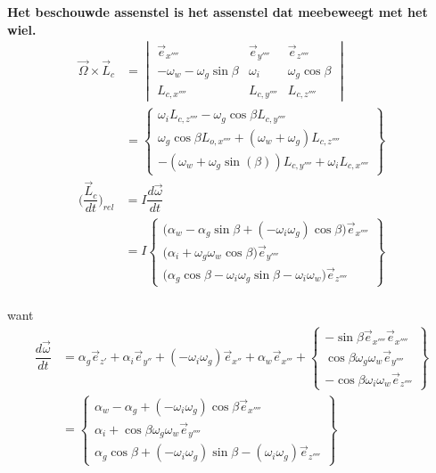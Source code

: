 \documentclass[a4paper,10pt]{article}
\begin{document}
\textbf{Het beschouwde assenstel is het assenstel dat meebeweegt met het wiel.}
\begin{equation}
\begin{aligned}
\vec{\Omega} \times \vec{L}_c &= \begin{vmatrix}
\vec{e}_{x''''} & \vec{e}_{y''''} & \vec{e}_{z''''}\\
-\omega_w -\omega_g  \sin{\beta} & \omega_i & \omega_g\cos{\beta} \\
L_{c,x''''} & L_{c,y''''}  & L_{c,z''''} 
\end{vmatrix}\\
&=\begin{Bmatrix}
\omega_i L_{c,z''''}-\omega_g \cos{\beta} L_{c,y''''}\\
\omega_g \cos{\beta} L_{o,x''''} + (\omega_w + \omega_g ) L_{c,z''''}\\
-(\omega_w + \omega_g \sin(\beta ))L_{c,y''''} + \omega_i L_{c,x''''}
\end{Bmatrix}
\end{aligned}
\end{equation}
\begin{equation}
\begin{aligned}
\Big( \dfrac{\vec{L}_c}{dt}\Big)_{rel} &= I \dfrac{d\vec{\omega}}{dt}\\
&= I \begin{Bmatrix}
\Big(\alpha_w - \alpha_g \sin{\beta} + (-\omega_i \omega_g)\cos{\beta}\Big)\vec{e}_{x''''}\\
\Big(\alpha_i + \omega_g\omega_w\cos{\beta}\Big)\vec{e}_{y''''}\\
\Big(\alpha_g \cos{\beta} - \omega_i\omega_g\sin{\beta}-\omega_i\omega_w\Big) \vec{e}_{z''''}
\end{Bmatrix}
\end{aligned}
\end{equation}\\
want \\
\begin{equation}
\begin{aligned}
\dfrac{d\vec{\omega}}{dt}&=\alpha_g \vec{e}_{z'} + \alpha_i \vec{e}_{y''} + (-\omega_i\omega_g)\vec{e}_{x''}+\alpha_w\vec{e}_{x'''} + \begin{Bmatrix}
-\sin{\beta}\vec{e}_{x''''}\vec{e}_{x''''}\\
\cos{\beta}\omega_g\omega_w \vec{e}_{y''''}\\
-\cos{\beta}\omega_i\omega_w \vec{e}_{z''''}
\end{Bmatrix}\\
&=\begin{Bmatrix}
\alpha_w - \alpha_g + (-\omega_i\omega_g)\cos{\beta} \vec{e}_{x''''}\\
\alpha_i + \cos{\beta}\omega_g\omega_w \vec{e}_{y''''}\\
\alpha_g\cos{\beta} + (-\omega_i\omega_g)\sin{\beta}- (\omega_i\omega_g) \vec{e}_{z''''}
\end{Bmatrix}
\end{aligned}
\end{equation}\\
\end{document}

